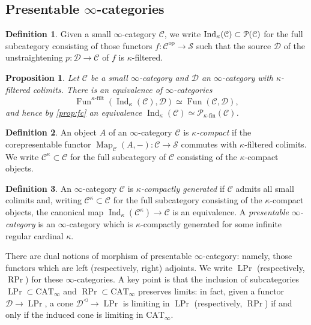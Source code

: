 \documentclass[12pt]{article}
\newtheorem{proposition}{Proposition}[subsection]
\theoremstyle{definition}
\newtheorem{definition}{Definition}[subsection]
\newcommand{\C}{\mathcal{C}}
\newcommand{\D}{\mathcal{D}}
\renewcommand{\P}{\mathcal{P}}
\renewcommand{\S}{\mathcal{S}}
\renewcommand{\i}{\infty}
\newcommand{\op}{\mathrm{op}}
\DeclareMathOperator{\Fun}{Fun}
\DeclareMathOperator{\Map}{Map}
\DeclareMathOperator{\PrL}{LPr}
\DeclareMathOperator{\PrR}{RPr}
\DeclareMathOperator{\Ind}{Ind}
\begin{document}
\subsection{Presentable $\infty$-categories}

\begin{definition}
Given a small $\infty$-category $\C$, we write
$
\Ind_\kappa(\C)\subset\P(\C)\index{$\Ind_\kappa$}
$
for the full subcategory consisting of those functors $f:\C^{\op}\to\S$ such that the source $\D$ of the unstraightening $p:\D\to\C$ of $f$ is $\kappa$-filtered.
\end{definition}
\begin{proposition}{\em \cite[Proposition 5.3.5.10]{HTT}}
Let $\C$ be a small $\i$-category and $\D$ an $\i$-category with $\kappa$-filtered colimits. There is an equivalence of $\i$-categories
\[
\Fun^{\kappa\textrm{-}\mathrm{filt}}(\Ind_\kappa(\C),\D)\simeq\Fun(\C,\D),
\]
and hence by \autoref{prop:fc} an equivalence $\Ind_\kappa(\C)\simeq\P_{\kappa\textrm{-}\mathrm{fin}}(\C)$.
\end{proposition}


\begin{definition}
An object $A$ of an $\infty$-category $\C$ is {\em $\kappa$-compact}
if the corepresentable functor $\Map_\C(A,-):\C\to\S$ commutes with $\kappa$-filtered colimits.
We write $\C^\kappa\subset\C$
\index{$\C^\kappa$}
for the full subcategory of $\C$ consisting of the $\kappa$-compact objects.
\end{definition}

\begin{definition}
An $\infty$-category $\C$ is {\em $\kappa$-compactly generated}
if $\C$ admits all small colimits and, writing $\C^\kappa\subset\C$ for the full subcategory consisting of the $\kappa$-compact objects, the canonical map $\Ind_\kappa(\C^\kappa)\to\C$ is an equivalence.
A {\em presentable $\infty$-category}
is an $\infty$-category which is $\kappa$-compactly generated for some infinite regular cardinal $\kappa$.
\end{definition}

There are dual notions of morphism of presentable $\infty$-category: namely, those functors which are left (respectively, right) adjoints.
We write $\PrL$
\index{$\PrL$}
\index{$\PrR$}
(respectively, $\PrR$) for these $\infty$-categories.
A key point \cite[Proposition 5.5.3.13 and Theorem 5.5.3.18]{HTT} is that the inclusion of subcategories $\PrL\subset\mathrm{CAT}_\i$ and $\PrR\subset\mathrm{CAT}_\i$ preserves limits: in fact, given a functor $\D\to\PrL$, a cone $\D^\triangleleft\to\PrL$ is limiting in $\PrL$ (respectively, $\PrR$) if and only if the induced cone is limiting in $\mathrm{CAT}_\i$.
\end{document}
